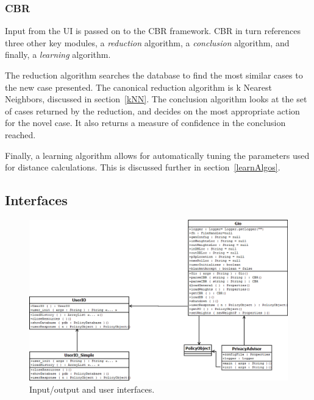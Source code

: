 \subsubsection{CBR}
Input from the UI is passed on to the CBR framework. CBR in turn references three other key modules, a \emph{reduction} algorithm, a \emph{conclusion} algorithm, and finally, a \emph{learning} algorithm.

The reduction algorithm searches the database to find the most similar cases to the new case presented. The canonical reduction algorithm is k Nearest Neighbors, discussed in section~\ref{kNN}. The conclusion algorithm looks at the set of cases returned by the reduction, and decides on the most appropriate action for the novel case. It also returns a measure of confidence in the conclusion reached.

Finally, a learning algorithm allows for automatically tuning the parameters used for distance calculations. This is discussed further in section~\ref{learnAlgos}.


\subsection{Interfaces}

      



\begin{figure}[htbp]
\begin{center}
\includegraphics[width = \textwidth]{DesignReport/uml/gio.png}
\caption{Input/output and user interfaces.}
\label{UserIO}
\end{center}
\end{figure}




